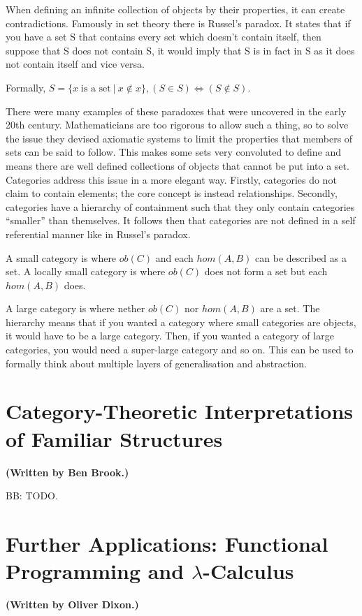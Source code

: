 \documentclass[10pt,a4paper,reqno]{amsart}
\begin{document}
When defining an infinite collection of objects by their properties, it can
create contradictions. Famously in set theory there is Russel's paradox.  It
states that if you have a set S that contains every set which doesn't contain
itself, then suppose that S does not contain S, it would imply that S is in fact
in S as it does not contain itself and vice versa.

Formally, $S = \{x\;\text{is a set}\:|\:x\notin x\}, (S\in S) \iff (S\notin S)$.

There were many examples of these paradoxes that were uncovered in the early
20th century. Mathematicians are too rigorous to allow such a thing, so to solve
the issue they devised axiomatic systems to limit the properties that members of
sets can be said to follow.  This makes some sets very convoluted to define and
means there are well defined collections of objects that cannot be put into a
set. Categories address this issue in a more elegant way.  Firstly, categories
do not claim to contain elements; the core concept is instead relationships.
Secondly, categories have a hierarchy of containment such that they only contain
categories ``smaller'' than themselves.  It follows then that categories are not
defined in a self referential manner like in Russel's paradox.

A small category is where $ob(C)$ and each $hom(A,B)$ can be described as a set.
A locally small category is where $ob(C)$ does not form a set but each
$hom(A,B)$ does.

A large category is where nether $ob(C)$ nor $hom(A,B)$ are a set. The hierarchy
means that if you wanted a category where small categories are objects, it would
have to be a large category. Then, if you wanted a category of large categories,
you would need a super-large category and so on. This can be used to formally
think about multiple layers of generalisation and abstraction.
\section{Category-Theoretic %
        Interpretations of Familiar Structures}
\begin{flushright}
        \textbf{(Written by Ben Brook.)}
\end{flushright}

\noindent BB: TODO.

\section{Further Applications: %
        Functional Programming and \texorpdfstring{$\lambda$}{Lambda}-Calculus}
\begin{flushright}
        \textbf{(Written by Oliver Dixon.)}
\end{flushright}
\end{document}
